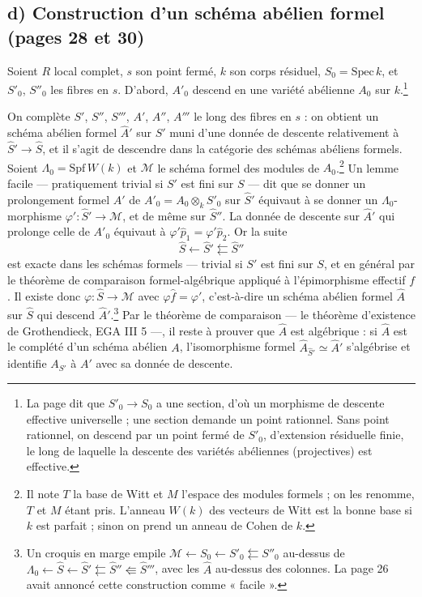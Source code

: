 \documentclass[11pt,a4paper]{article}
\begin{document}
\subsection*{d) Construction d'un schéma abélien formel (pages 28 et 30)}

Soient $R$ local complet, $s$ son point fermé, $k$ son corps résiduel,
$S_0 = \mathrm{Spec}\,k$, et $S'_0$, $S''_0$ les fibres en $s$. D'abord,
$A'_0$ descend en une variété abélienne $A_0$ sur $k$.\footnote{La page dit
que $S'_0 \to S_0$ a une section, d'où un morphisme de descente effective
universelle ; une section demande un point rationnel. Sans point rationnel, on descend par un point
fermé de $S'_0$, d'extension résiduelle finie, le long de laquelle la
descente des variétés abéliennes (projectives) est effective.}

On complète $S'$, $S''$, $S'''$, $A'$, $A''$, $A'''$ le long des fibres en $s$
: on obtient un schéma abélien formel $\hat A'$ sur $\hat S'$ muni d'une
donnée de descente relativement à $\hat S' \to \hat S$, et il s'agit de
descendre dans la catégorie des schémas abéliens formels. Soient
$\Lambda_0 = \mathrm{Spf}\,W(k)$ et $\mathcal{M}$ le schéma formel des
modules de $A_0$.\footnote{Il note $T$ la base de Witt et $M$ l'espace des
modules formels ; on les renomme, $T$ et $M$ étant pris. L'anneau $W(k)$ des
vecteurs de Witt est la bonne base si $k$ est parfait ; sinon on prend un
anneau de Cohen de $k$.} Un lemme facile --- pratiquement trivial si $S'$ est
fini sur $S$ --- dit que se donner un prolongement formel $\hat A'$ de
$A'_0 = A_0 \otimes_k S'_0$ sur $\hat S'$ équivaut à se donner un
$\Lambda_0$-morphisme $\varphi' : \hat S' \to \mathcal{M}$, et de même sur
$\hat S''$. La donnée de descente sur $\hat A'$ qui prolonge celle de
$A'_0$ équivaut à $\varphi' \hat p_1 = \varphi' \hat p_2$. Or la suite
\[
  \hat S \longleftarrow \hat S' \leftleftarrows \hat S''
\]
est exacte dans les schémas formels --- trivial si $S'$ est fini sur $S$, et en
général par le théorème de comparaison formel-algébrique appliqué à
l'épimorphisme effectif $f$. Il existe donc $\varphi : \hat S \to \mathcal{M}$
avec $\varphi \hat f = \varphi'$, c'est-à-dire un schéma abélien formel $\hat
A$ sur $\hat S$ qui descend $\hat A'$.\footnote{Un croquis en marge empile
$\mathcal{M} \leftarrow S_0 \leftarrow S'_0 \leftleftarrows S''_0$ au-dessus
de $\Lambda_0 \leftarrow \hat S \leftarrow \hat S' \leftleftarrows \hat S''
\Lleftarrow \hat S'''$, avec les $\hat A$ au-dessus des colonnes. La page 26
avait annoncé cette construction comme « facile ».} Par le théorème de
comparaison --- le théorème d'existence de Grothendieck, EGA III 5 ---, il
reste à prouver que $\hat A$ est algébrique : si $\hat A$ est le complété d'un
schéma abélien $A$, l'isomorphisme formel $\hat A_{\hat S'} \simeq \hat A'$
s'algébrise et identifie $A_{S'}$ à $A'$ avec sa donnée de descente.
\end{document}
